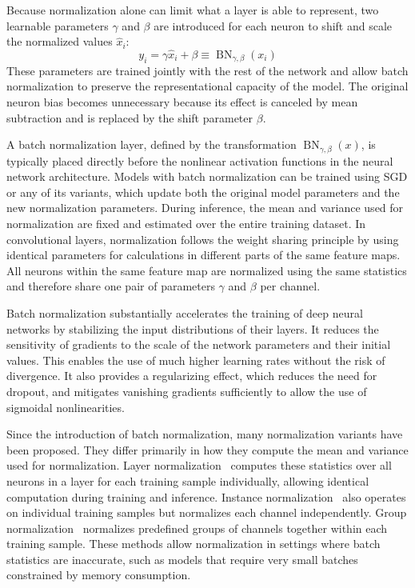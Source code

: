 Because normalization alone can limit what a layer is able to represent, two learnable parameters $\gamma$ and $\beta$ are introduced for each neuron to shift and scale the normalized values $\hat{x}_i$:
\begin{equation}
    y_i = \gamma\hat{x}_i + \beta \equiv \operatorname{BN}_{\gamma, \beta}(x_i)
\end{equation}
These parameters are trained jointly with the rest of the network and allow batch normalization to preserve the representational capacity of the model. The original neuron bias becomes unnecessary because its effect is canceled by mean subtraction and is replaced by the shift parameter $\beta$.

A batch normalization layer, defined by the transformation $\operatorname{BN}_{\gamma, \beta}(x)$, is typically placed directly before the nonlinear activation functions in the neural network architecture. Models with batch normalization can be trained using SGD or any of its variants, which update both the original model parameters and the new normalization parameters. During inference, the mean and variance used for normalization are fixed and estimated over the entire training dataset. In convolutional layers, normalization follows the weight sharing principle by using identical parameters for calculations in different parts of the same feature maps. All neurons within the same feature map are normalized using the same statistics and therefore share one pair of parameters $\gamma$ and $\beta$ per channel.

Batch normalization substantially accelerates the training of deep neural networks by stabilizing the input distributions of their layers. It reduces the sensitivity of gradients to the scale of the network parameters and their initial values. This enables the use of much higher learning rates without the risk of divergence. It also provides a regularizing effect, which reduces the need for dropout, and mitigates vanishing gradients sufficiently to allow the use of sigmoidal nonlinearities.~\cite{Ioffe2015}

Since the introduction of batch normalization, many normalization variants have been proposed. They differ primarily in how they compute the mean and variance used for normalization. Layer normalization~\cite{Ba2016} computes these statistics over all neurons in a layer for each training sample individually, allowing identical computation during training and inference. Instance normalization~\cite{Ulyanov2017} also operates on individual training samples but normalizes each channel independently. Group normalization~\cite{Wu2018} normalizes predefined groups of channels together within each training sample. These methods allow normalization in settings where batch statistics are inaccurate, such as models that require very small batches constrained by memory consumption.~\cite{Szeliski2022}


